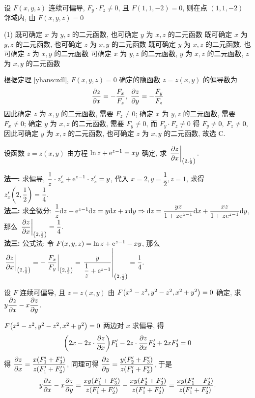 \begin{example}
    设 $F(x,y,z)$ 连续可偏导, $F_y\cdot F_z\neq 0$, 且 $F(1,1,-2)=0$, 则在点 $(1,1,-2)$ 邻域内, 由 $F(x,y,z)=0$
    \begin{tasks}(1)
        \task 既可确定 $x$ 为 $y,z$ 的二元函数, 也可确定 $y$ 为 $x,z$ 的二元函数
        \task 既可确定 $x$ 为 $y,z$ 的二元函数, 也可确定 $z$ 为 $x,y$ 的二元函数
        \task 既可确定 $y$ 为 $x,z$ 的二元函数, 也可确定 $z$ 为 $x,y$ 的二元函数
        \task 可确定 $x$ 为 $y,z$ 的二元函数, $y$ 为 $x,z$ 的二元函数,  $z$ 为 $x,y$ 的二元函数
    \end{tasks}
\end{example}
\begin{solution}
    根据定理 \ref{yhansczdl}, $F(x,y,z)=0$ 确定的隐函数 $z=z(x,y)$ 的偏导数为
    $$\pdv{z}{x}=-\dfrac{F_x}{F_z},~\pdv{z}{y}=-\dfrac{F_y}{F_z}$$
    因此确定 $z$ 为 $x,y$ 的二元函数, 需要 $F_z\neq0$; 确定 $x$ 为 $y,z$ 的二元函数, 需要 $F_x\neq0$; 确定 $y$ 为 $x,z$ 的二元函数, 需要 $F_y\neq0$,
    而 $F_y\cdot F_z\neq 0$ 得 $F_y\neq0,~F_z\neq0$, 因此可确定 $y$ 为 $x,z$ 的二元函数, 也可确定 $z$ 为 $x,y$ 的二元函数, 故选 C.
\end{solution}

\begin{example}[2018 数三]
    设函数 $z=z(x,y)$ 由方程 $\ln z+\mathrm{e} ^{z-1}=xy$ 确定, 求 $\displaystyle\eval{\pdv{z}{x}}_{\qty(2,\frac{1}{2})}.$
\end{example}
\begin{solution}
    \textbf{法一: }求偏导, $\displaystyle\dfrac{1}{z}\cdot z'_x+\mathrm{e}^{z-1}\cdot z'_x=y$, 代入 $x=2,y=\dfrac{1}{2},z=1$, 求得 $z'_x\qty(2,\dfrac{1}{2})=\dfrac{1}{4}.$\\
    \textbf{法二: }求全微分: $\dfrac{1}{z}\dd z+\mathrm{e} ^{z-1}\dd z=y\dd x+x\dd y\Rightarrow \dd z=\dfrac{yz}{1+z\mathrm{e} ^{z-1}}\dd x+\dfrac{xz}{1+z\mathrm{e} ^{z-1}}\dd y$, 那么 $\displaystyle\eval{\pdv{z}{x}}_{\qty(2,\frac{1}{2})}=\dfrac{1}{4}.$\\
    \textbf{法三: }公式法: 令 $F(x,y,z)=\ln z+\mathrm{e} ^{z-1}-xy$, 那么 $\displaystyle\eval{\pdv{z}{x}}_{\qty(2,\frac{1}{2})}=-\eval{\dfrac{F_x}{F_y}}_{\qty(2,\frac{1}{2})}=\eval{\dfrac{y}{\dfrac{1}{z}+\e ^{z-1}}}_{\qty(2,\frac{1}{2})}=\dfrac{1}{4}.$
\end{solution}

\begin{example}
    设 $F$ 连续可偏导, 且 $z=z(x,y)$ 由 $F\qty(x^2-z^2, y^2-z^2, x^2+y^2)=0$ 确定, 求 $\displaystyle y\pdv{z}{x}-x\pdv{z}{y}$.
\end{example}
\begin{solution}
    $F\qty(x^2-z^2, y^2-z^2, x^2+y^2)=0$ 两边对 $x$ 求偏导, 得
    $$
        \qty(2x-2z\cdot\pdv{z}{x})F'_1-2z\cdot\pdv{z}{x}F'_2+2xF'_3=0
    $$
    得 $\displaystyle \pdv{z}{x}=\dfrac{x\qty(F'_1+F'_3)}{z\qty(F'_1+F'_2)}$, 同理可得 $\displaystyle \pdv{z}{y}=\dfrac{y\qty(F'_2+F'_3)}{z\qty(F'_1+F'_2)}$, 于是
    $$
        y\pdv{z}{x}-x\pdv{z}{y}=\dfrac{xy\qty(F'_1+F'_3)}{z\qty(F'_1+F'_2)}-\dfrac{xy\qty(F'_2+F'_3)}{z\qty(F'_1+F'_2)}=\dfrac{xy\qty(F'_1-F'_2)}{z\qty(F'_1+F'_2)}.
    $$
\end{solution}

